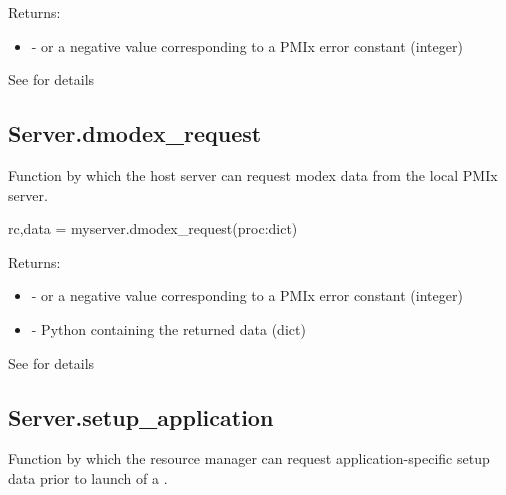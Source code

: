 Returns:

\begin{itemize}
    \item {} -  or a negative value corresponding to a PMIx error constant (integer)
\end{itemize}


See  for details


\subsection{Server.dmodex_request}

\summary
Function by which the host server can request modex data from the local PMIx server.

\format

\pyspecificstart
\begin{codepar}
rc,data = myserver.dmodex_request(proc:dict)
\end{codepar}
\pyspecificend


\begin{arglist}
\end{arglist}

Returns:

\begin{itemize}
    \item {} -  or a negative value corresponding to a PMIx error constant (integer)
    \item {} - Python  containing the returned data (dict)
\end{itemize}


See  for details


\subsection{Server.setup_application}

\summary
Function by which the resource manager can request application-specific setup data prior to launch of a .

\format

